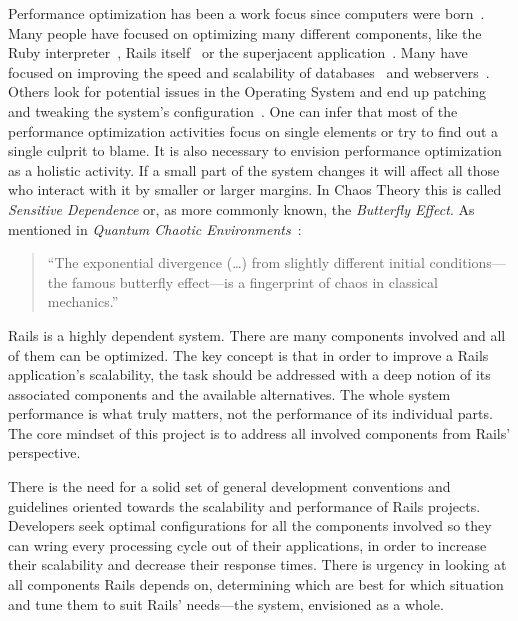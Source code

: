Performance optimization has been a work focus since computers were born~\cite{mass_memory_system_optimization}. Many people have focused on optimizing many different components, like the Ruby interpreter~\cite{yarv}, Rails itself~\cite{rails_merb_merge_performance} or the superjacent application~\cite{scaling_rails_bottomup,vaporware_to_awesome,rebuilding_scaling_yellowpages,5tips_scale_ror}. Many have focused on improving the speed and scalability of databases~\cite{performance_analysis_db_arch} and webservers~\cite{webserver_scheduling}. Others look for potential issues in the Operating System and end up patching and tweaking the system's configuration~\cite{unix_os_comparison, architecture_impact_os}. One can infer that most of the performance optimization activities focus on single elements or try to find out a single culprit to blame. It is also necessary to envision performance optimization as a holistic activity. If a small part of the system changes it will affect all those who interact with it by smaller or larger margins. In Chaos Theory this is called \textit{Sensitive Dependence} or, as more commonly known, the \textit{Butterfly Effect}. As mentioned in \textit{Quantum Chaotic Environments}~\cite{butterfly_effect_quote}:
\begin{quote}
  ``The exponential divergence (\ldots) from slightly different initial conditions---the famous butterfly effect---is a fingerprint of chaos in classical mechanics.''
\end{quote}
Rails is a highly dependent system. There are many components involved and all of them can be optimized. The key concept is that in order to improve a Rails application's scalability, the task should be addressed with a deep notion of its associated components and the available alternatives. The whole system performance is what truly matters, not the performance of its individual parts. The core mindset of this project is to address all involved components from Rails' perspective.

There is the need for a solid set of general development conventions and guidelines oriented towards the scalability and performance of Rails projects. Developers seek optimal configurations for all the components involved so they can wring every processing cycle out of their applications, in order to increase their scalability and decrease their response times. There is urgency in looking at all components Rails depends on, determining which are best for which situation and tune them to suit Rails' needs---the system, envisioned as a whole.


